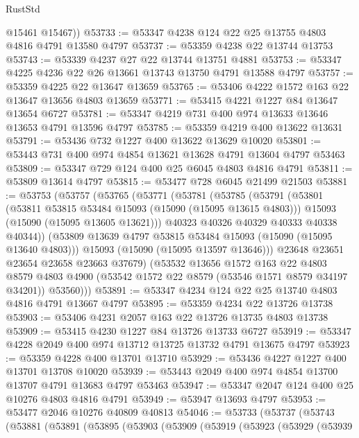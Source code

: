 \begin{lexlean}{RustStd}
\begin{coremodule}
        @15461
        @15467))
@53733 := @53347 @4238 @124 @22 @25 @13755 @4803 @4816 @4791 @13580 @4797
@53737 := @53359 @4238 @22 @13744 @13753
@53743 := @53339 @4237 @27 @22 @13744 @13751 @4881
@53753 := @53347 @4225 @4236 @22 @26 @13661 @13743 @13750 @4791 @13588 @4797
@53757 := @53359 @4225 @22 @13647 @13659
@53765 := @53406 @4222 @1572 @163 @22 @13647 @13656 @4803 @13659
@53771 := @53415 @4221 @1227 @84 @13647 @13654 @6727
@53781 := @53347 @4219 @731 @400 @974 @13633 @13646 @13653 @4791 @13596 @4797
@53785 := @53359 @4219 @400 @13622 @13631
@53791 := @53436 @732 @1227 @400 @13622 @13629 @10020
@53801 := @53443 @731 @400 @974 @4854 @13621 @13628 @4791 @13604 @4797 @53463
@53809 := @53347 @729 @124 @400 @25 @6045 @4803 @4816 @4791
@53811 := @53809 @13614 @4797
@53815 := @53477 @728 @6045 @21499 @21503
@53881 := @53753
    (@53757
      (@53765
        (@53771
          (@53781
            (@53785
              (@53791
                (@53801
                  (@53811 @53815 @53484 @15093 (@15090 (@15095 @13615 @4803)))
                  @15093
                  (@15090 (@15095 @13605 @13621)))
                @40323
                @40326
                @40329
                @40333
                @40338
                @40344))
            (@53809 @13639 @4797 @53815 @53484 @15093 (@15090 (@15095 @13640 @4803)))
            @15093
            (@15090 (@15095 @13597 @13646)))
          @23648
          @23651
          @23654
          @23658
          @23663
          @37679)
        (@53532
          @13656
          @1572
          @163
          @22
          @4803
          @8579
          @4803
          @4900
          (@53542 @1572 @22 @8579 (@53546 @1571 @8579 @34197 @34201))
          @53560)))
@53891 := @53347 @4234 @124 @22 @25 @13740 @4803 @4816 @4791 @13667 @4797
@53895 := @53359 @4234 @22 @13726 @13738
@53903 := @53406 @4231 @2057 @163 @22 @13726 @13735 @4803 @13738
@53909 := @53415 @4230 @1227 @84 @13726 @13733 @6727
@53919 := @53347 @4228 @2049 @400 @974 @13712 @13725 @13732 @4791 @13675 @4797
@53923 := @53359 @4228 @400 @13701 @13710
@53929 := @53436 @4227 @1227 @400 @13701 @13708 @10020
@53939 := @53443 @2049 @400 @974 @4854 @13700 @13707 @4791 @13683 @4797 @53463
@53947 := @53347 @2047 @124 @400 @25 @10276 @4803 @4816 @4791
@53949 := @53947 @13693 @4797
@53953 := @53477 @2046 @10276 @40809 @40813
@54046 := @53733
    (@53737
      (@53743
        (@53881
          (@53891
            (@53895
              (@53903
                (@53909
                  (@53919
                    (@53923
                      (@53929
                        (@53939

\end{coremodule}
\end{lexlean}
